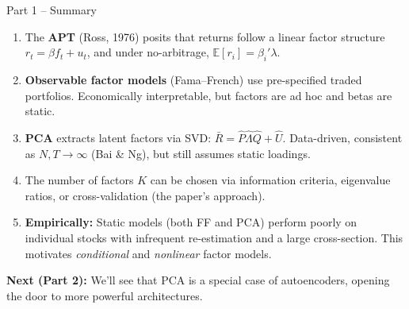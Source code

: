 \documentclass[aspectratio=169]{beamer}
\newcommand{\E}{\mathbb{E}}
\begin{document}
\begin{frame}{Part 1 -- Summary}

\begin{enumerate}
    \item The \textbf{APT} (Ross, 1976) posits that returns follow a linear factor structure $r_t = \beta f_t + u_t$, and under no-arbitrage, $\E[r_i] = \beta_i' \lambda$.
    
    \vspace{0.3em}
    \item \textbf{Observable factor models} (Fama--French) use pre-specified traded portfolios. Economically interpretable, but factors are ad hoc and betas are static.
    
    \vspace{0.3em}
    \item \textbf{PCA} extracts latent factors via SVD: $\bar{R} = \hat{P}\hat{\Lambda}\hat{Q} + \hat{U}$. Data-driven, consistent as $N,T \to \infty$ (Bai \& Ng), but still assumes static loadings.
    
    \vspace{0.3em}
    \item The number of factors $K$ can be chosen via information criteria, eigenvalue ratios, or cross-validation (the paper's approach).
    
    \vspace{0.3em}
    \item \textbf{Empirically:} Static models (both FF and PCA) perform poorly on individual stocks with infrequent re-estimation and a large cross-section. This motivates \emph{conditional} and \emph{nonlinear} factor models.
\end{enumerate}

\vspace{0.5em}
\textbf{Next (Part 2):} We'll see that PCA is a special case of autoencoders, opening the door to more powerful architectures.
\end{frame}
%
\end{document}
